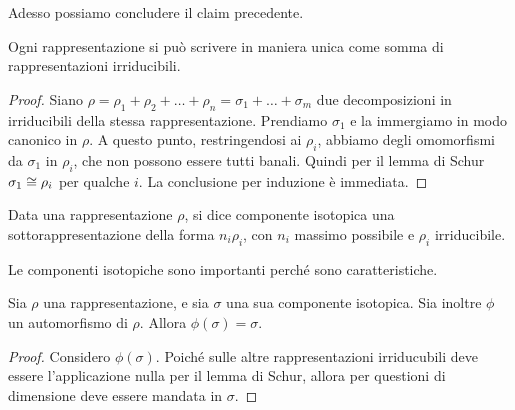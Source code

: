 	Adesso possiamo concludere il claim precedente.
	\begin{myprop}
		Ogni rappresentazione si può scrivere in maniera unica come somma di rappresentazioni irriducibili.
	\end{myprop}
	\begin{proof}
		Siano $\rho = \rho_1 + \rho_2 + \dots + \rho_n = \sigma_1 + \dots +\sigma_m$ due decomposizioni in irriducibili della stessa rappresentazione. Prendiamo $\sigma_1$ e la immergiamo in modo canonico in $\rho$. A questo punto, restringendosi ai $\rho_i$, abbiamo degli omomorfismi da $\sigma_1$ in $\rho_i$, che non possono essere tutti banali. Quindi per il lemma di Schur $\sigma_1\cong \rho_i$ per qualche $i$. La conclusione per induzione è immediata. 
	\end{proof}

	\begin{mydef}
		Data una rappresentazione $\rho$, si dice componente isotopica una sottorappresentazione della forma $n_i\rho_i$, con $n_i$ massimo possibile e $\rho_i$ irriducibile.
	\end{mydef}

	Le componenti isotopiche sono importanti perché sono caratteristiche.

	\begin{myprop}
		Sia $\rho$ una rappresentazione, e sia $\sigma$ una sua componente isotopica. Sia inoltre $\phi$ un automorfismo di $\rho$. Allora $\phi(\sigma)=\sigma$.
	\end{myprop}

	\begin{proof}
		Considero $\phi(\sigma)$. Poiché sulle altre rappresentazioni irriducubili deve essere l'applicazione nulla per il lemma di Schur, allora per questioni di dimensione deve essere mandata in $\sigma$.
	\end{proof}
  
